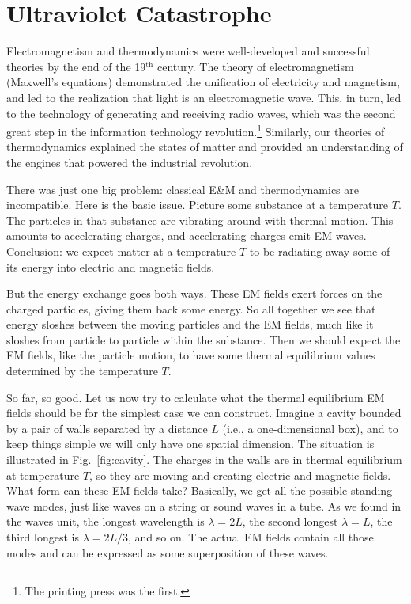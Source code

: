 \section{Ultraviolet Catastrophe}
\label{sec:uv_catastrophe}

Electromagnetism and thermodynamics were well-developed and successful
theories by the end of the 19$^\text{th}$ century.  The theory of
electromagnetism (Maxwell's equations) demonstrated the 
unification of electricity and magnetism, and led to the realization
that light is an electromagnetic wave.  This, in turn, led to the
technology of generating and receiving radio waves, which was the
second great step in the information technology revolution.\footnote{The
printing press was the first.}  Similarly, our theories of
thermodynamics explained the states of matter and provided an 
understanding of the engines that powered the industrial revolution.

There was just one big problem: classical E\&M and thermodynamics
are incompatible.  Here is the basic issue.  Picture some substance
at a temperature $T$.  The particles in that substance are vibrating
around with thermal motion.  This amounts to accelerating charges, and
accelerating charges emit EM waves.  Conclusion: we expect matter at a
temperature $T$ to be radiating away some of its energy into electric
and magnetic fields.

But the energy exchange goes both ways.  These EM fields exert forces
on the charged particles, giving them back some energy.  So all
together we see that energy sloshes between the moving particles and
the EM fields, much like it sloshes from particle to particle within
the substance.  Then we should expect the EM fields, like the particle
motion, to have some thermal equilibrium values determined by the
temperature $T$.

So far, so good.  Let us now try to calculate what the thermal
equilibrium EM fields should be for the simplest case we can
construct.  Imagine a cavity bounded by a pair of walls separated by a
distance $L$ (i.e., a one-dimensional box), and to keep things simple 
we will only have one spatial
dimension.  The situation is illustrated in Fig.~\ref{fig:cavity}. The
charges in the walls are in thermal equilibrium at temperature $T$, so
they are moving and creating electric and magnetic fields.  What form
can these EM fields take?  Basically, we get all the possible standing
wave modes, just like waves on a string or sound waves in a tube.  As
we found in the waves unit, the longest wavelength is $\lambda=2L$,
the second longest $\lambda=L$, the third longest is $\lambda=2L/3$,
and so on.  The actual EM fields contain all those modes and can be
expressed as some superposition of these waves.

